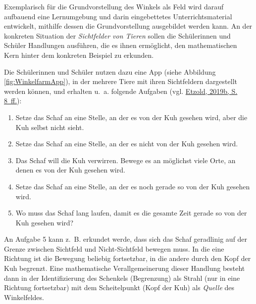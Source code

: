 \documentclass[
]{scrbook}
\providecommand{\tightlist}{%
  \setlength{\itemsep}{0pt}\setlength{\parskip}{0pt}}
\theoremstyle{definition}
\theoremstyle{definition}
\theoremstyle{definition}
\theoremstyle{definition}
\theoremstyle{remark}
\begin{document}
Exemplarisch für die Grundvorstellung des Winkels als Feld wird darauf aufbauend eine Lernumgebung und darin eingebettetes Unterrichtsmaterial entwickelt, mithilfe dessen die Grundvorstellung ausgebildet werden kann. An der konkreten Situation der \emph{Sichtfelder von Tieren} sollen die Schülerinnen und Schüler Handlungen ausführen, die es ihnen ermöglicht, den mathematischen Kern hinter dem konkreten Beispiel zu erkunden.

Die Schülerinnen und Schüler nutzen dazu eine App (siehe Abbildung \ref{fig:WinkelfarmApp}), in der mehrere Tiere mit ihren Sichtfeldern dargestellt werden können, und erhalten u.~a. folgende Aufgaben (vgl. \protect\hyperlink{ref-Etzold:2019Praxis4}{Etzold, 2019b, S. 8~ff.}):

\begin{enumerate}
\def\labelenumi{\arabic{enumi}.}
\tightlist
\item
  Setze das Schaf an eine Stelle, an der es von der Kuh gesehen wird, aber die Kuh selbst nicht sieht.
\item
  Setze das Schaf an eine Stelle, an der es nicht von der Kuh gesehen wird.
\item
  Das Schaf will die Kuh verwirren. Bewege es an möglichst viele Orte, an denen es von der Kuh gesehen wird.
\item
  Setze das Schaf an eine Stelle, an der es noch gerade so von der Kuh gesehen wird.
\item
  Wo muss das Schaf lang laufen, damit es die gesamte Zeit gerade so von der Kuh gesehen wird?
\end{enumerate}

An Aufgabe 5 kann z.~B. erkundet werde, dass sich das Schaf geradlinig auf der Grenze zwischen Sichtfeld und Nicht-Sichtfeld bewegen muss. In die eine Richtung ist die Bewegung beliebig fortsetzbar, in die andere durch den Kopf der Kuh begrenzt. Eine mathematische Verallgemeinerung dieser Handlung besteht dann in der Identifizierung des Schenkels (Begrenzung) als Strahl (nur in eine Richtung fortsetzbar) mit dem Scheitelpunkt (Kopf der Kuh) als \emph{Quelle} des Winkelfeldes.
\end{document}
